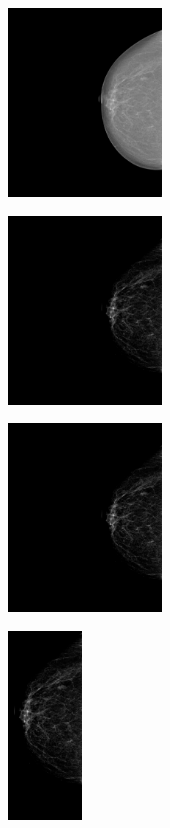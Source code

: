 \begin{figure}[h]
	\centering
	\begin{subfigure}{4.2 cm}
		\centering
                \includegraphics[height = 5cm]{plots/mammogram.png}
    \end{subfigure}
	\begin{subfigure}{4.2 cm}
		\centering
                \includegraphics[height = 5cm]{plots/mammogram_enhanced.png}
    \end{subfigure}
	\begin{subfigure}{4.2 cm}
		\centering
                \includegraphics[height = 5cm]{plots/mammogram_resized.png}
    \end{subfigure}
	\begin{subfigure}{2.4 cm}
		\centering
                \includegraphics[height = 5cm]{plots/mammogram_v1.png}

\end{subfigure}
\end{figure}
